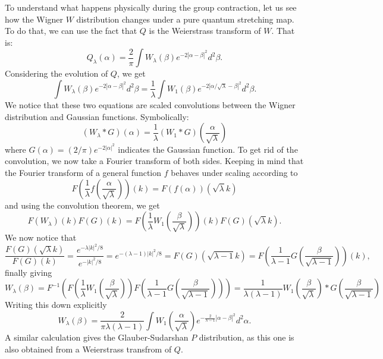 \documentclass{article}
\begin{document}
To understand what happens physically during the group contraction, let us see how the Wigner $W$ distribution changes under a pure quantum stretching map. To do that, we can use the fact that $Q$ is the Weierstrass transform of $W$. That is:
\begin{equation}
    Q_\lambda(\alpha)=\frac{2}{\pi}\int W_\lambda(\beta)e^{-2|\alpha-\beta|^2}d^2\beta.
\end{equation}
Considering the evolution of $Q$, we get
\begin{equation}
    \int W_\lambda(\beta)e^{-2|\alpha-\beta|^2}d^2\beta=\frac{1}{\lambda}\int W_1(\beta)e^{-2|\alpha/\sqrt{\lambda}-\beta|^2}d^2\beta.
\end{equation}
We notice that these two equations are scaled convolutions between the Wigner distribution and Gaussian functions. Symbolically:
\begin{equation}
    (W_\lambda \ast G)(\alpha)=\frac{1}{\lambda}(W_1\ast G)\left(\frac{\alpha}{\sqrt{\lambda}}\right)
\end{equation}
where $G(\alpha)=(2/\pi) e^{-2|\alpha|^2}$ indicates the Gaussian function. To get rid of the convolution, we now take a Fourier transform of both sides. Keeping in mind that the Fourier transform of a general function $f$ behaves under scaling according to
\begin{equation}
    F\left(\frac{1}{\lambda}f\left(\frac{\alpha}{\sqrt{\lambda}}\right)\right)(k)=F(f(\alpha))(\sqrt{\lambda}k)
\end{equation} and using the convolution theorem, we get
\begin{equation}
  F(W_\lambda)(k)F(G)(k)=F\left(\frac{1}{\lambda}W_1\left(\frac{\beta}{\sqrt{\lambda}}\right)\right)(k)F(G)(\sqrt{\lambda}k).  
\end{equation}
We now notice that
\begin{equation}
    \frac{F(G)(\sqrt{\lambda}k)}{F(G)(k)}=\frac{e^{-\lambda|k|^2/8}}{e^{-|k|^2/8}}=e^{-(\lambda-1)|k|^2/8}=F(G)(\sqrt{\lambda-1}k)=F\left(\frac{1}{\lambda-1}G\left(\frac{\beta}{\sqrt{\lambda-1}}\right)\right)(k),
\end{equation}
finally giving
\begin{equation}
    W_\lambda(\beta)=F^{-1}\left(F\left(\frac{1}{\lambda}W_1\left(\frac{\beta}{\sqrt{\lambda}}\right)\right)F\left(\frac{1}{\lambda-1}G\left(\frac{\beta}{\sqrt{\lambda-1}}\right)\right)\right)=\frac{1}{\lambda(\lambda-1)}W_1\left(\frac{\beta}{\sqrt{\lambda}}\right) \ast G\left(\frac{\beta}{\sqrt{\lambda-1}}\right)
    \label{Fourier}
\end{equation}
Writing this down explicitly
\begin{equation}
   W_\lambda(\beta)=\frac{2}{\pi\lambda(\lambda-1)}\int W_1\left(\frac{\alpha}{\sqrt{\lambda}}\right)e^{-\frac{2}{\lambda-1}\left|\alpha-\beta\right|^2}d^2\alpha.
\end{equation}
A similar calculation gives the Glauber-Sudarshan $P$ distribution, as this one is also obtained from a Weierstrass transfrom of $Q$.
\end{document}
